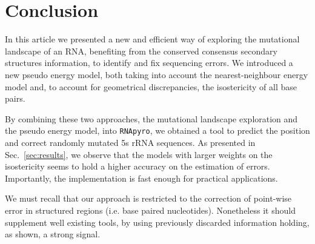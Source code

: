 \section{Conclusion}
\label{sec:conclusion}

In this article we presented a new and efficient way of
exploring the mutational landscape of an RNA, benefiting from the
 conserved consensus secondary structures  information,
to identify and fix sequencing errors. We introduced a new
 pseudo energy model, both taking into account the nearest-neighbour energy model 
and, to account for geometrical discrepancies,  the isostericity of all base pairs. 

By combining these two approaches,  the 
mutational landscape exploration and the pseudo energy model,
 into \texttt{RNApyro}, we obtained a tool to predict the position and 
correct randomly mutated 5s rRNA sequences. 
As presented in Sec.~\ref{sec:results},
we observe that the models
with larger weights on the
isostericity seems to hold a higher accuracy on the estimation of errors.
Importantly, the implementation is fast enough for practical applications. 


We must recall that our approach is restricted to
 the correction of point-wise error in structured regions (i.e. base paired nucleotides).
 Nonetheless it should supplement well existing tools, by using previously discarded
information holding, as shown, a strong signal.

